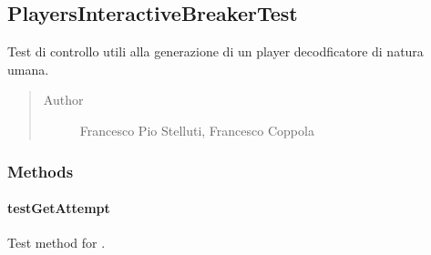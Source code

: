 \documentclass[letterpaper,10pt,italian,openany,oneside]{sphinxmanual}
\begin{document}
\subsection{PlayersInteractiveBreakerTest}
\label{\detokenize{test/it/unicam/cs/pa/mastermind/test/PlayersInteractiveBreakerTest:playersinteractivebreakertest}}\label{\detokenize{test/it/unicam/cs/pa/mastermind/test/PlayersInteractiveBreakerTest::doc}}

\begin{fulllineitems}
\label{\detokenize{test/it/unicam/cs/pa/mastermind/test/PlayersInteractiveBreakerTest:it.unicam.cs.pa.mastermind.test.PlayersInteractiveBreakerTest}}
Test di controllo utili alla generazione di un player decodficatore di natura umana.
\begin{quote}\begin{description}
\item[{Author}] \leavevmode
Francesco Pio Stelluti, Francesco Coppola

\end{description}\end{quote}

\end{fulllineitems}



\subsubsection{Methods}
\label{\detokenize{test/it/unicam/cs/pa/mastermind/test/PlayersInteractiveBreakerTest:methods}}

\paragraph{testGetAttempt}
\label{\detokenize{test/it/unicam/cs/pa/mastermind/test/PlayersInteractiveBreakerTest:testgetattempt}}

\begin{fulllineitems}
\label{\detokenize{test/it/unicam/cs/pa/mastermind/test/PlayersInteractiveBreakerTest:it.unicam.cs.pa.mastermind.test.PlayersInteractiveBreakerTest.testGetAttempt()}}
Test method for .

\end{fulllineitems}
\end{document}
